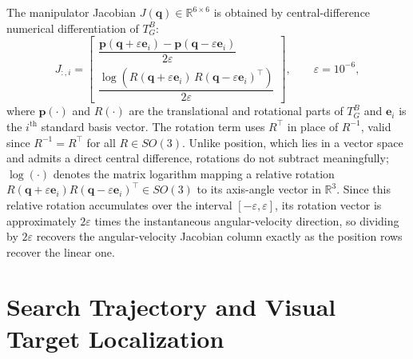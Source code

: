 The manipulator Jacobian $J(\mathbf{q}) \in \mathbb{R}^{6\times 6}$ is obtained by central-difference
numerical differentiation of $T^{B}_{G}$:
\begin{equation}
J_{:,i} =
\begin{bmatrix}
\dfrac{\mathbf{p}(\mathbf{q}+\varepsilon\mathbf{e}_i) - \mathbf{p}(\mathbf{q}-\varepsilon\mathbf{e}_i)}{2\varepsilon} \\[1.2ex]
\dfrac{\log\!\left( R(\mathbf{q}+\varepsilon\mathbf{e}_i)\, R(\mathbf{q}-\varepsilon\mathbf{e}_i)^\top \right)}{2\varepsilon}
\end{bmatrix}, \qquad \varepsilon = 10^{-6},
\label{eq:sv_jacobian}
\end{equation}
where $\mathbf{p}(\cdot)$ and $R(\cdot)$ are the translational and rotational parts of $T^{B}_{G}$
and $\mathbf{e}_i$ is the $i^{\text{th}}$ standard basis vector. The rotation term uses $R^\top$ in
place of $R^{-1}$, valid since $R^{-1} = R^\top$ for all $R \in SO(3)$. Unlike position, which lies
in a vector space and admits a direct central difference, rotations do not subtract meaningfully;
$\log(\cdot)$ denotes the matrix logarithm mapping a relative rotation
$R(\mathbf{q}+\varepsilon\mathbf{e}_i)R(\mathbf{q}-\varepsilon\mathbf{e}_i)^\top \in SO(3)$ to its
axis-angle vector in $\mathbb{R}^3$. Since this relative rotation accumulates over the interval
$[-\varepsilon, \varepsilon]$, its rotation vector is approximately $2\varepsilon$ times the instantaneous
angular-velocity direction, so dividing by $2\varepsilon$ recovers the angular-velocity Jacobian column
exactly as the position rows recover the linear one.

\section{Search Trajectory and Visual Target Localization}\label{sec:sv_search}

